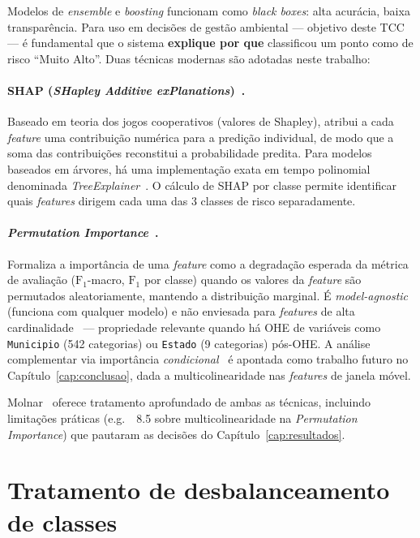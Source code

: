 Modelos de \emph{ensemble} e \emph{boosting} funcionam como \emph{black boxes}: alta acurácia, baixa transparência. Para uso em decisões de gestão ambiental --- objetivo deste TCC --- é fundamental que o sistema \textbf{explique por que} classificou um ponto como de risco ``Muito Alto''. Duas técnicas modernas são adotadas neste trabalho:

\paragraph{SHAP (\emph{SHapley Additive exPlanations})~\cite{lundberg2017unified}.} Baseado em teoria dos jogos cooperativos (valores de Shapley), atribui a cada \emph{feature} uma contribuição numérica para a predição individual, de modo que a soma das contribuições reconstitui a probabilidade predita. Para modelos baseados em árvores, há uma implementação exata em tempo polinomial denominada \emph{TreeExplainer}~\cite{lundberg2020local}. O cálculo de SHAP por classe permite identificar quais \emph{features} dirigem cada uma das 3 classes de risco separadamente.

\paragraph{\emph{Permutation Importance}~\cite{breiman2001random,fisher2019all}.} Formaliza a importância de uma \emph{feature} como a degradação esperada da métrica de avaliação (\(\text{F}_1\)-macro, \(\text{F}_1\) por classe) quando os valores da \emph{feature} são permutados aleatoriamente, mantendo a distribuição marginal. É \emph{model-agnostic} (funciona com qualquer modelo) e não enviesada para \emph{features} de alta cardinalidade~\cite{strobl2007bias} --- propriedade relevante quando há OHE de variáveis como \texttt{Municipio} (542 categorias) ou \texttt{Estado} (9 categorias) pós-OHE. A análise complementar via importância \emph{condicional}~\cite{hooker2021unrestricted} é apontada como trabalho futuro no Capítulo~\ref{cap:conclusao}, dada a multicolinearidade nas \emph{features} de janela móvel.

Molnar~\cite{molnar2022interpretable} oferece tratamento aprofundado de ambas as técnicas, incluindo limitações práticas (e.g.\ \textsection~8.5 sobre multicolinearidade na \emph{Permutation Importance}) que pautaram as decisões do Capítulo~\ref{cap:resultados}.

\section{Tratamento de desbalanceamento de classes}
\label{sec:fund_desbalanceamento}

